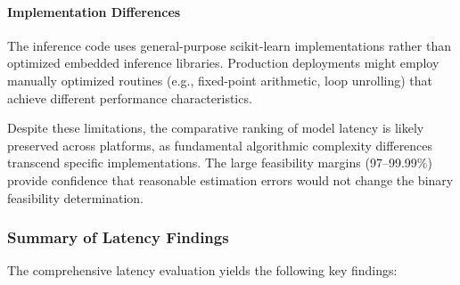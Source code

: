 \paragraph{Implementation Differences}
The inference code uses general-purpose scikit-learn implementations rather than optimized embedded inference libraries. Production deployments might employ manually optimized routines (e.g., fixed-point arithmetic, loop unrolling) that achieve different performance characteristics.

Despite these limitations, the comparative ranking of model latency is likely preserved across platforms, as fundamental algorithmic complexity differences transcend specific implementations. The large feasibility margins (97--99.99\%) provide confidence that reasonable estimation errors would not change the binary feasibility determination.

\subsubsection{Summary of Latency Findings}

The comprehensive latency evaluation yields the following key findings:

